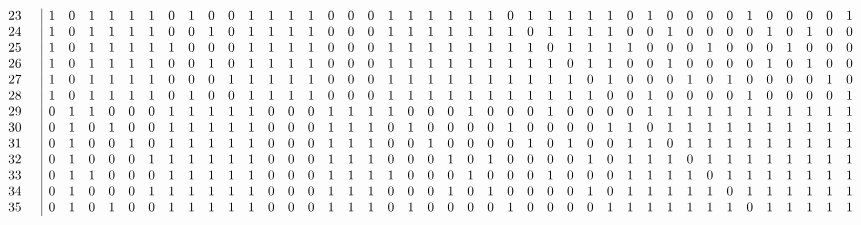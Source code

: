 \documentclass{article}
\begin{document}
{{$$\begin{array}{rr|*{41}r}
23 &  & 1 & 0 & 1 & 1 & 1 & 1 & 0 & 1 & 0 & 0 & 1 & 1 & 1 & 1 & 0 & 0 & 0 & 1 & 1 & 1 & 1 & 1 & 1 & 0 & 1 & 1 & 1 & 1 & 1 & 0 & 1 & 0 & 0 & 0 & 0 & 1 & 0 & 0 & 0 & 0 & 1\\
24 &  & 1 & 0 & 1 & 1 & 1 & 1 & 0 & 0 & 1 & 0 & 1 & 1 & 1 & 1 & 0 & 0 & 0 & 1 & 1 & 1 & 1 & 1 & 1 & 1 & 0 & 1 & 1 & 1 & 1 & 0 & 0 & 1 & 0 & 0 & 0 & 0 & 1 & 0 & 1 & 0 & 0\\
25 &  & 1 & 0 & 1 & 1 & 1 & 1 & 1 & 0 & 0 & 0 & 1 & 1 & 1 & 1 & 0 & 0 & 0 & 1 & 1 & 1 & 1 & 1 & 1 & 1 & 1 & 0 & 1 & 1 & 1 & 1 & 0 & 0 & 0 & 1 & 0 & 0 & 0 & 1 & 0 & 0 & 0\\
26 &  & 1 & 0 & 1 & 1 & 1 & 1 & 0 & 0 & 1 & 0 & 1 & 1 & 1 & 1 & 0 & 0 & 0 & 1 & 1 & 1 & 1 & 1 & 1 & 1 & 1 & 1 & 0 & 1 & 1 & 0 & 0 & 1 & 0 & 0 & 0 & 0 & 1 & 0 & 1 & 0 & 0\\
27 &  & 1 & 0 & 1 & 1 & 1 & 1 & 0 & 0 & 0 & 1 & 1 & 1 & 1 & 1 & 0 & 0 & 0 & 1 & 1 & 1 & 1 & 1 & 1 & 1 & 1 & 1 & 1 & 0 & 1 & 0 & 0 & 0 & 1 & 0 & 1 & 0 & 0 & 0 & 0 & 1 & 0\\
28 &  & 1 & 0 & 1 & 1 & 1 & 1 & 0 & 1 & 0 & 0 & 1 & 1 & 1 & 1 & 0 & 0 & 0 & 1 & 1 & 1 & 1 & 1 & 1 & 1 & 1 & 1 & 1 & 1 & 0 & 0 & 1 & 0 & 0 & 0 & 0 & 1 & 0 & 0 & 0 & 0 & 1\\
29 &  & 0 & 1 & 1 & 0 & 0 & 0 & 1 & 1 & 1 & 1 & 1 & 0 & 0 & 0 & 1 & 1 & 1 & 1 & 0 & 0 & 0 & 1 & 0 & 0 & 0 & 1 & 0 & 0 & 0 & 0 & 1 & 1 & 1 & 1 & 1 & 1 & 1 & 1 & 1 & 1 & 1\\
30 &  & 0 & 1 & 0 & 1 & 0 & 0 & 1 & 1 & 1 & 1 & 1 & 0 & 0 & 0 & 1 & 1 & 1 & 0 & 1 & 0 & 0 & 0 & 0 & 1 & 0 & 0 & 0 & 0 & 1 & 1 & 0 & 1 & 1 & 1 & 1 & 1 & 1 & 1 & 1 & 1 & 1\\
31 &  & 0 & 1 & 0 & 0 & 1 & 0 & 1 & 1 & 1 & 1 & 1 & 0 & 0 & 0 & 1 & 1 & 1 & 0 & 0 & 1 & 0 & 0 & 0 & 0 & 1 & 0 & 1 & 0 & 0 & 1 & 1 & 0 & 1 & 1 & 1 & 1 & 1 & 1 & 1 & 1 & 1\\
32 &  & 0 & 1 & 0 & 0 & 0 & 1 & 1 & 1 & 1 & 1 & 1 & 0 & 0 & 0 & 1 & 1 & 1 & 0 & 0 & 0 & 1 & 0 & 1 & 0 & 0 & 0 & 0 & 1 & 0 & 1 & 1 & 1 & 0 & 1 & 1 & 1 & 1 & 1 & 1 & 1 & 1\\
33 &  & 0 & 1 & 1 & 0 & 0 & 0 & 1 & 1 & 1 & 1 & 1 & 0 & 0 & 0 & 1 & 1 & 1 & 1 & 0 & 0 & 0 & 1 & 0 & 0 & 0 & 1 & 0 & 0 & 0 & 1 & 1 & 1 & 1 & 0 & 1 & 1 & 1 & 1 & 1 & 1 & 1\\
34 &  & 0 & 1 & 0 & 0 & 0 & 1 & 1 & 1 & 1 & 1 & 1 & 0 & 0 & 0 & 1 & 1 & 1 & 0 & 0 & 0 & 1 & 0 & 1 & 0 & 0 & 0 & 0 & 1 & 0 & 1 & 1 & 1 & 1 & 1 & 0 & 1 & 1 & 1 & 1 & 1 & 1\\
35 &  & 0 & 1 & 0 & 1 & 0 & 0 & 1 & 1 & 1 & 1 & 1 & 0 & 0 & 0 & 1 & 1 & 1 & 0 & 1 & 0 & 0 & 0 & 0 & 1 & 0 & 0 & 0 & 0 & 1 & 1 & 1 & 1 & 1 & 1 & 1 & 0 & 1 & 1 & 1 & 1 & 1\\

\end{array}$$}}
\end{document}
